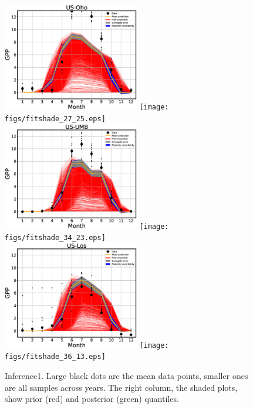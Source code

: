 \documentclass[12pt]{article}
\begin{document}
\begin{figure}[!hb]
\includegraphics[width=0.53\textwidth]{figs/fit1d_27_25.eps}\hfill
\texttt{[image: figs/fitshade\_27\_25.eps]}\\
\includegraphics[width=0.53\textwidth]{figs/fit1d_34_23.eps}\hfill
\texttt{[image: figs/fitshade\_34\_23.eps]}\\
\includegraphics[width=0.53\textwidth]{figs/fit1d_36_13.eps}\hfill
\texttt{[image: figs/fitshade\_36\_13.eps]}
\caption{\label{fig:fits1} Inference1. Large black dots are the mean data points, smaller ones are all samples across years. The right column, the shaded plots, show prior (red) and posterior (green) quantiles.}
\end{figure}
\end{document}
